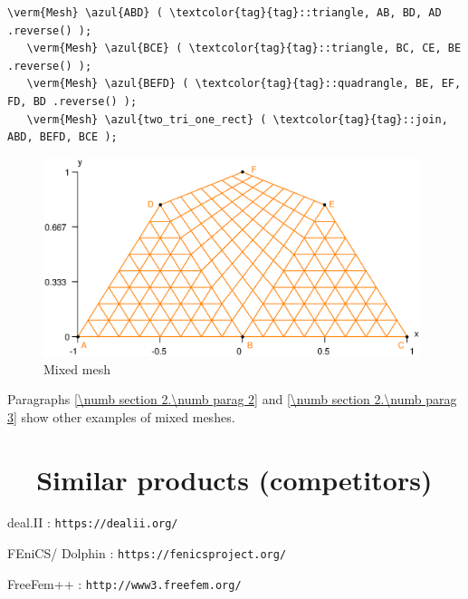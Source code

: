 \begin{Verbatim}[commandchars=\\\{\},formatcom=\small\tt,frame=single,
   label=parag-\ref{\numb section 1.\numb parag 6}.cpp,rulecolor=\color{coment},
   baselinestretch=0.94,framesep=2mm]
   \verm{Mesh} \azul{ABD} ( \textcolor{tag}{tag}::triangle, AB, BD, AD .reverse() );
   \verm{Mesh} \azul{BCE} ( \textcolor{tag}{tag}::triangle, BC, CE, BE .reverse() );
   \verm{Mesh} \azul{BEFD} ( \textcolor{tag}{tag}::quadrangle, BE, EF, FD, BD .reverse() );
   \verm{Mesh} \azul{two_tri_one_rect} ( \textcolor{tag}{tag}::join, ABD, BEFD, BCE );
\end{Verbatim}

\begin{figure}[ht] \centering
  \includegraphics[width=110mm]{two-tri-one-rect}
  \caption{Mixed mesh}
  \label{\numb section 1.\numb fig 8}
\end{figure}

Paragraphs \ref{\numb section 2.\numb parag 2} and \ref{\numb section 2.\numb parag 3}
show other examples of mixed meshes.


\section{~~Similar products (competitors)}\label{\numb section 1.\numb parag 7}

deal.II : {\small\tt https://dealii.org/}

FEniCS/ Dolphin : {\small\tt https://fenicsproject.org/}

FreeFem++ : {\small\tt http://www3.freefem.org/}

